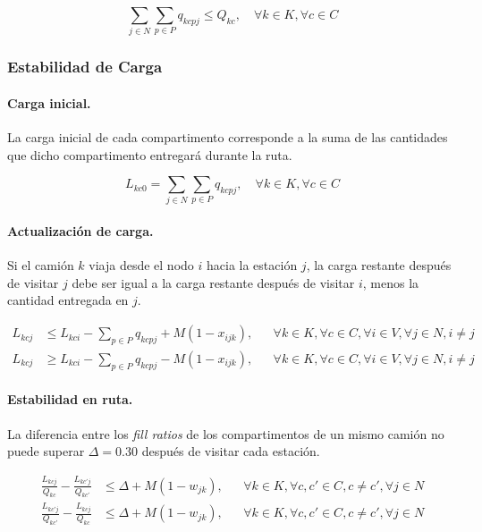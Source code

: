 \begin{equation}
    \sum_{j \in N} \sum_{p \in P} q_{kcpj} \leq Q_{kc},
    \quad \forall k \in K, \forall c \in C
\end{equation}

\subsubsection{Estabilidad de Carga}

\paragraph{Carga inicial.}

La carga inicial de cada compartimento corresponde a la suma de las cantidades que dicho compartimento entregará durante la ruta.

\begin{equation}
    L_{kc0} =
    \sum_{j \in N} \sum_{p \in P} q_{kcpj},
    \quad \forall k \in K, \forall c \in C
\end{equation}

\paragraph{Actualización de carga.}

Si el camión $k$ viaja desde el nodo $i$ hacia la estación $j$, la carga restante después de visitar $j$ debe ser igual a la carga restante después de visitar $i$, menos la cantidad entregada en $j$.

\begin{align}
    L_{kcj}
    &\leq
    L_{kci}
    -
    \sum_{p \in P} q_{kcpj}
    +
    M(1-x_{ijk}),
    && \forall k \in K, \forall c \in C, \forall i \in V, \forall j \in N, i \neq j \\
    L_{kcj}
    &\geq
    L_{kci}
    -
    \sum_{p \in P} q_{kcpj}
    -
    M(1-x_{ijk}),
    && \forall k \in K, \forall c \in C, \forall i \in V, \forall j \in N, i \neq j
\end{align}

\paragraph{Estabilidad en ruta.}

La diferencia entre los \textit{fill ratios} de los compartimentos de un mismo camión no puede superar $\Delta = 0.30$ después de visitar cada estación.

\begin{align}
    \frac{L_{kcj}}{Q_{kc}}
    -
    \frac{L_{kc'j}}{Q_{kc'}}
    &\leq
    \Delta + M(1-w_{jk}),
    && \forall k \in K, \forall c,c' \in C, c \neq c', \forall j \in N \\
    \frac{L_{kc'j}}{Q_{kc'}}
    -
    \frac{L_{kcj}}{Q_{kc}}
    &\leq
    \Delta + M(1-w_{jk}),
    && \forall k \in K, \forall c,c' \in C, c \neq c', \forall j \in N
\end{align}


